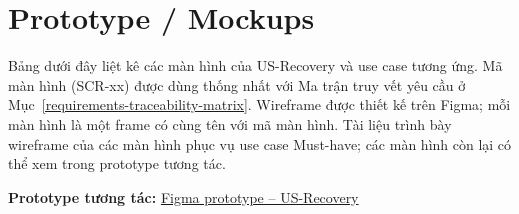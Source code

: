 \clearpage
\section{Prototype / Mockups}\label{prototype-mockups}

Bảng dưới đây liệt kê các màn hình của US-Recovery và use case tương ứng.
Mã màn hình (SCR-xx) được dùng thống nhất với Ma trận truy vết yêu cầu ở
Mục~\ref{requirements-traceability-matrix}. Wireframe được thiết kế trên Figma;
mỗi màn hình là một frame có cùng tên với mã màn hình. Tài liệu trình bày
wireframe của các màn hình phục vụ use case Must-have; các màn hình còn lại
có thể xem trong prototype tương tác.

\textbf{Prototype tương tác:}
\href{https://www.figma.com/design/RIcHWj9dLTwpNBgFgyr4aH/SE-LAB?node-id=44-26&t=7qYy3ClUu2M67OQr-1}{Figma prototype -- US-Recovery}

